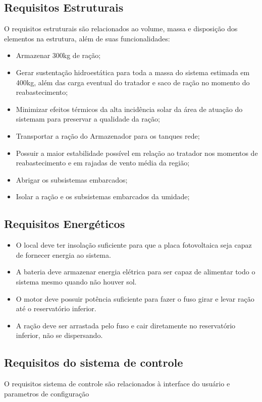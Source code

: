 \subsection{Requisitos Estruturais}

O requisitos estruturais são relacionados ao volume, massa e disposição dos elementos na estrutura, além de suas funcionalidades:

\begin{itemize}
  \item Armazenar 300kg de ração;
  \item Gerar sustentação hidroestática para toda a massa do sistema estimada em 400kg, além das carga eventual do tratador e saco de ração no momento do reabastecimento;
  \item Minimizar efeitos térmicos da alta incidência solar da área de atuação do sistemam para preservar a qualidade da ração;
  \item Transportar a ração do Armazenador para os tanques rede;
  \item Possuir a maior estabilidade possível em relação ao tratador nos momentos de reabastecimento e em rajadas de vento média da região;
  \item Abrigar os subsistemas embarcados;
  \item Isolar a ração e os subsistemas embarcados da umidade;
\end{itemize}

\subsection{Requisitos Energéticos}
\begin{itemize}
  \item O local deve ter insolação suficiente para que a placa fotovoltaica seja capaz de fornecer energia ao sistema.
\item A bateria deve armazenar energia elétrica para ser capaz de alimentar todo o sistema mesmo quando não houver sol.
\item O motor deve possuir potência suficiente para fazer o fuso girar e levar ração até o reservatório inferior.
\item A ração deve ser arrastada pelo fuso e cair diretamente no reservatório inferior, não se dispersando.
\end{itemize}
\subsection{Requisitos do sistema de controle}
O requisitos sistema de controle são relacionados à interface do usuário e parametros de configuração

